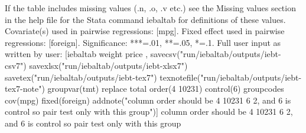 If the table includes missing values (.n, .o, .v etc.) see the Missing values section in the help file for the Stata command iebaltab for definitions of these values. Covariate(s) used in pairwise regressions: [mpg]. Fixed effect used in pairwise regressions: [foreign]. Significance: ***=.01, **=.05, *=.1. Full user input as written by user: [iebaltab weight price , savecsv("run/iebaltab/outputs/iebt-csv7") savexlsx("run/iebaltab/outputs/iebt-xlsx7") savetex("run/iebaltab/outputs/iebt-tex7") texnotefile("run/iebaltab/outputs/iebt-tex7-note") groupvar(tmt) replace total order(4 10231) control(6) groupcodes cov(mpg) fixed(foreign) addnote("column order should be 4 10231 6 2, and 6 is control so pair test only with this group")] column order should be 4 10231 6 2, and 6 is control so pair test only with this group

